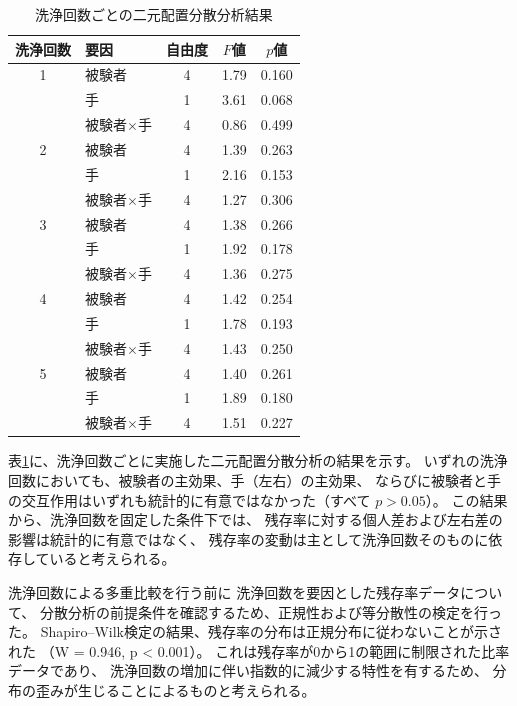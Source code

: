 \begin{table}[htbp]
  \centering
  \caption{洗浄回数ごとの二元配置分散分析結果}
  \label{tab:anova_wash_each}
  \small
  \begin{tabular}{c l c c c}
    \hline
    洗浄回数 & 要因 & 自由度 & $F$値 & $p$値 \\
    \hline
    1 & 被験者        & 4 & 1.79 & 0.160 \\
      & 手            & 1 & 3.61 & 0.068 \\
      & 被験者$\times$手 & 4 & 0.86 & 0.499 \\
    \hline
    2 & 被験者        & 4 & 1.39 & 0.263 \\
      & 手            & 1 & 2.16 & 0.153 \\
      & 被験者$\times$手 & 4 & 1.27 & 0.306 \\
    \hline
    3 & 被験者        & 4 & 1.38 & 0.266 \\
      & 手            & 1 & 1.92 & 0.178 \\
      & 被験者$\times$手 & 4 & 1.36 & 0.275 \\
    \hline
    4 & 被験者        & 4 & 1.42 & 0.254 \\
      & 手            & 1 & 1.78 & 0.193 \\
      & 被験者$\times$手 & 4 & 1.43 & 0.250 \\
    \hline
    5 & 被験者        & 4 & 1.40 & 0.261 \\
      & 手            & 1 & 1.89 & 0.180 \\
      & 被験者$\times$手 & 4 & 1.51 & 0.227 \\
    \hline
  \end{tabular}
\end{table}

表\ref{tab:anova_wash_each}に、洗浄回数ごとに実施した二元配置分散分析の結果を示す。
いずれの洗浄回数においても、被験者の主効果、手（左右）の主効果、
ならびに被験者と手の交互作用はいずれも統計的に有意ではなかった（すべて $p > 0.05$）。
この結果から、洗浄回数を固定した条件下では、
残存率に対する個人差および左右差の影響は統計的に有意ではなく、
残存率の変動は主として洗浄回数そのものに依存していると考えられる。

洗浄回数による多重比較を行う前に
洗浄回数を要因とした残存率データについて、
分散分析の前提条件を確認するため、正規性および等分散性の検定を行った。
Shapiro–Wilk検定の結果、残存率の分布は正規分布に従わないことが示された
（W = 0.946, p < 0.001）。
これは残存率が0から1の範囲に制限された比率データであり、
洗浄回数の増加に伴い指数的に減少する特性を有するため、
分布の歪みが生じることによるものと考えられる。

